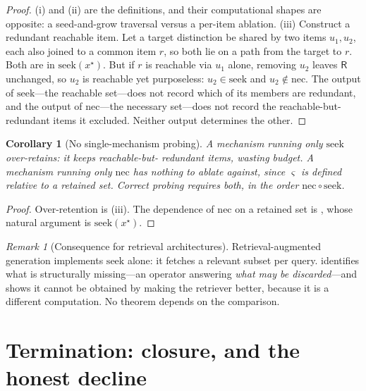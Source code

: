 \documentclass[11pt,twocolumn,a4paper]{article}
\theoremstyle{dirthm}
\newtheorem{corollary}[theorem]{Corollary}
\theoremstyle{definition}
\theoremstyle{remark}
\newtheorem{remark}[theorem]{Remark}
\newcommand{\nec}{\mathrm{nec}}
\newcommand{\seek}{\mathrm{seek}}
\newcommand{\Res}{\mathsf{R}}
\begin{document}
\begin{proof}
(i) and (ii) are the definitions, and their computational shapes are
opposite: a seed-and-grow traversal versus a per-item ablation. (iii)
Construct a redundant reachable item. Let a target distinction be shared by
two items $u_1,u_2$, each also joined to a common item $r$, so both lie on a
path from the target to $r$. Both are in $\seek(x^{\star})$. But if $r$ is
reachable via $u_1$ alone, removing $u_2$ leaves $\Res$ unchanged, so $u_2$ is
reachable yet purposeless: $u_2\in\seek$ and $u_2\notin\nec$. The output of
$\seek$---the reachable set---does not record which of its members are
redundant, and the output of $\nec$---the necessary set---does not record the
reachable-but-redundant items it excluded. Neither output determines the
other.
\end{proof}

\begin{corollary}[No single-mechanism probing]
\label{cor:no-single}
A mechanism running only $\seek$ over-retains: it keeps reachable-but-%
redundant items, wasting budget. A mechanism running only $\nec$ has nothing
to ablate against, since $\varsigma$ is defined relative to a retained set.
Correct probing requires both, in the order $\nec\circ\seek$.
\end{corollary}

\begin{proof}
Over-retention is (iii). The dependence of
$\nec$ on a retained set is , whose natural argument is
$\seek(x^{\star})$.
\end{proof}

\begin{remark}[Consequence for retrieval architectures]
\label{rem:retrieval}
Retrieval-augmented generation \citep{lewis2020} implements $\seek$ alone:
it fetches a relevant subset per query.  identifies what
is structurally missing---an operator answering \emph{what may be
discarded}---and  shows it cannot be obtained
by making the retriever better, because it is a different computation. No
theorem depends on the comparison.
\end{remark}

\section{Termination: closure, and the honest decline}
\label{sec:closure}
\end{document}

